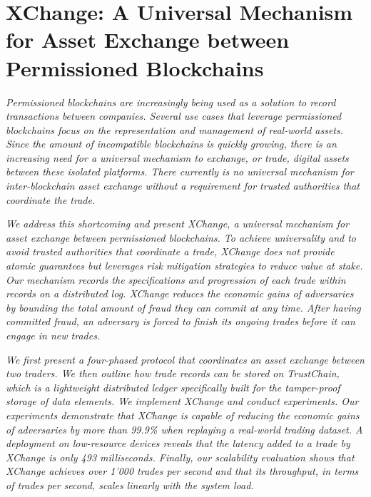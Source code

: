 \chapter{XChange: A Universal Mechanism for Asset Exchange between Permissioned Blockchains}
\label{chapter:xchange}

\emph{Permissioned blockchains are increasingly being used as a solution to record transactions between companies.
Several use cases that leverage permissioned blockchains focus on the representation and management of real-world assets.
Since the amount of incompatible blockchains is quickly growing, there is an increasing need for a universal mechanism to exchange, or trade, digital assets between these isolated platforms.
There currently is no \emph{universal} mechanism for inter-blockchain asset exchange without a requirement for trusted authorities that coordinate the trade.}

\emph{We address this shortcoming and present XChange, a universal mechanism for asset exchange between permissioned blockchains.
To achieve universality and to avoid trusted authorities that coordinate a trade, XChange does not provide atomic guarantees but leverages risk mitigation strategies to reduce value at stake.
Our mechanism records the specifications and progression of each trade within records on a distributed log.
XChange reduces the economic gains of adversaries by bounding the total amount of fraud they can commit at any time.
After having committed fraud, an adversary is forced to finish its ongoing trades before it can engage in new trades.}

\emph{We first present a four-phased protocol that coordinates an asset exchange between two traders.
We then outline how trade records can be stored on TrustChain, which is a lightweight distributed ledger specifically built for the tamper-proof storage of data elements.
We implement XChange and conduct experiments.
Our experiments demonstrate that XChange is capable of reducing the economic gains of adversaries by more than 99.9\% when replaying a real-world trading dataset.
A deployment on low-resource devices reveals that the latency added to a trade by XChange is only 493 milliseconds.
Finally, our scalability evaluation shows that XChange achieves over 1'000 trades per second and that its throughput, in terms of trades per second, scales linearly with the system load.}

\newpage

